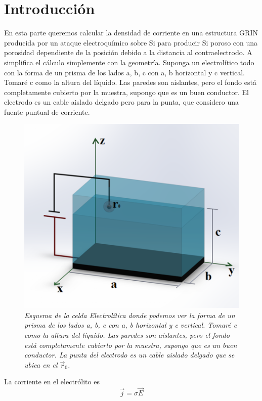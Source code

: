 \documentclass[a4paper,11pt,]{book}
\begin{document}
\section{Introducción}
En esta parte queremos calcular  la densidad de corriente en una estructura GRIN producida por un ataque electroquímico sobre Si para producir Si poroso con una porosidad dependiente de la posición debido a la distancia al contraelectrodo. A simplifica el cálculo simplemente con la geometría.
Suponga un electrolítico todo con la forma de un prisma de los lados a, b, c con a, b horizontal y c vertical. Tomaré c como la altura del líquido. Las paredes son aislantes, pero el fondo está completamente cubierto por la muestra,  supongo que es un buen conductor. El electrodo es un cable aislado delgado pero para la punta, que considero una fuente puntual de corriente.
\begin{figure}[H]
	\centering
	\includegraphics[scale=.4]{../Images/celdan} 
	\caption{\emph{ Esquema de la celda Electrolítica donde podemos ver la forma de un prisma de los lados a, b, c con a, b horizontal y c vertical. Tomaré c como la altura del líquido. Las paredes son aislantes, pero el fondo está completamente cubierto por la muestra,  supongo que es un buen conductor. La punta del electrodo es un cable aislado delgado que se ubica en el $\vec{r}_0$.}}
\end{figure}
La corriente en el electrólito es
\begin{equation}
\vec{j} = \sigma \vec{E}
\end{equation}
\end{document}
